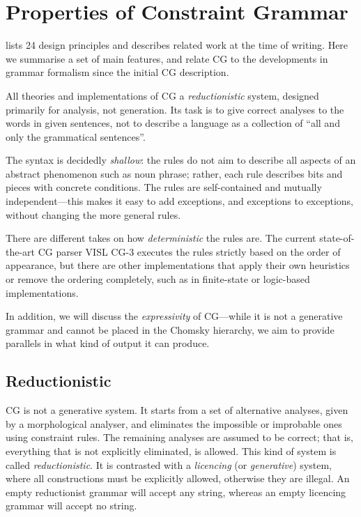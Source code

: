 {


\section{Properties of Constraint Grammar}\label{sec:properties}

\cite{karlsson1995constraint} lists 24 design principles and describes
related work at the time of writing.
Here we summarise a set of main features, and relate CG to the developments in grammar formalism since the initial CG description.

All theories and implementations of CG  a \emph{reductionistic}
system, designed primarily for analysis, not generation.
Its task is to give correct analyses to the words in given sentences,
not to describe a language as a collection of ``all and only the grammatical sentences''.

The syntax is decidedly \emph{shallow}: the rules do not aim to
describe all aspects of an abstract phenomenon such as noun phrase; 
rather, each rule describes bits and pieces with concrete conditions.
The rules are self-contained and mutually independent---this makes it 
easy to add exceptions, and exceptions to exceptions, without 
changing the more general rules.

There are different takes on how \emph{deterministic} the rules are.
The current state-of-the-art CG parser VISL CG-3 executes the rules strictly based on the order of appearance, but there
are other implementations that apply their own heuristics or remove the
ordering completely, such as in finite-state or logic-based implementations. 

In addition, we will discuss the \emph{expressivity} of CG---while it is not a generative grammar and cannot be placed in the Chomsky hierarchy, we aim to provide parallels in what kind of output it can produce.

\subsection{Reductionistic}\label{reductionist-vs.licencing}

CG is not a generative system.
It starts from a set of alternative analyses, given by a morphological analyser,
and eliminates the impossible or improbable ones using constraint rules. 
The remaining analyses are assumed to be correct; that
is, everything that is not explicitly eliminated, is allowed. 
This kind of system is called \emph{reductionistic}. It is contrasted 
with a \emph{licencing} (or \emph{generative}) system, where all constructions must
be explicitly allowed, otherwise they are illegal. 
An empty reductionist grammar will accept any string, whereas an empty
licencing grammar will accept no string.

}
